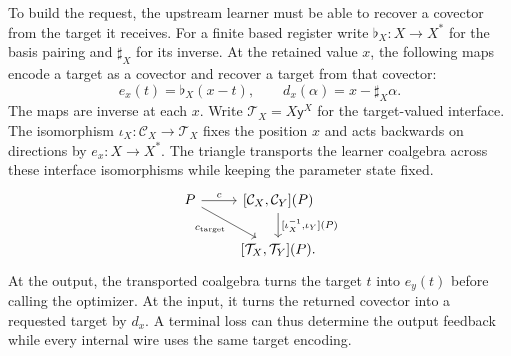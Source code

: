 \documentclass[11pt,a4paper]{article}
\theoremstyle{definition}
\theoremstyle{remark}\newaliascnt{remark}{theorem}
\numberwithin{equation}{section}
\begin{document}
To build the request, the upstream learner must be able to recover a covector from the target it receives. For a finite based register write $\flat_X:X\to X^*$ for the basis pairing and $\sharp_X$ for its inverse. At the retained value $x$, the following maps encode a target as a covector and recover a target from that covector:
\[
 e_x(t)=\flat_X(x-t),\qquad d_x(\alpha)=x-\sharp_X\alpha .
\]
The maps are inverse at each $x$. Write $\mathcal T_X=X\mathsf y^X$ for the target-valued interface. The isomorphism $\iota_X:\mathcal C_X\to\mathcal T_X$ fixes the position $x$ and acts backwards on directions by $e_x:X\to X^*$. The triangle transports the learner coalgebra across these interface isomorphisms while keeping the parameter state fixed.
\[
\begin{tikzcd}[column sep=normal]
 P\arrow[r,"c"]\arrow[dr,"c_{\rm target}"']&
 {[\mathcal C_X,\mathcal C_Y](P)}\arrow[d,"{[\iota_X^{-1},\iota_Y](P)}"]\\
 &{[\mathcal T_X,\mathcal T_Y](P)}.
\end{tikzcd}
\]
At the output, the transported coalgebra turns the target $t$ into $e_y(t)$ before calling the optimizer. At the input, it turns the returned covector into a requested target by $d_x$. A terminal loss can thus determine the output feedback while every internal wire uses the same target encoding.
\end{document}
